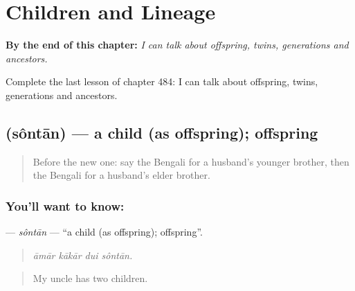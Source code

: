 
\chapter{Children and Lineage}
\label{ch:bn-children-and-lineage}

\begin{chapteropening}
\textbf{By the end of this chapter:} \emph{I can talk about offspring, twins, generations and ancestors.}

Complete the last lesson of chapter 484: I can talk about offspring, twins, generations and ancestors.
\end{chapteropening}

\section[\texorpdfstring{\bn{সন্তান} (sôntān)}{সন্তান (sôntān)}]{ (sôntān) — a child (as offspring); offspring}

\label{lesson:BN-C484-sontan}



\begin{quote}
Before the new one: say the Bengali for a husband's younger brother, then the Bengali for a husband's elder brother.
\end{quote}

\subsection*{You'll want to know: }
\textbf{} — \emph{sôntān} — \textquotedblleft{}a child (as offspring); offspring\textquotedblright{}.

\begin{quote}
   
\end{quote}

\begin{quote}
\emph{āmār kākār dui sôntān.}
\end{quote}

\begin{quote}
My uncle has two children.
\end{quote}

